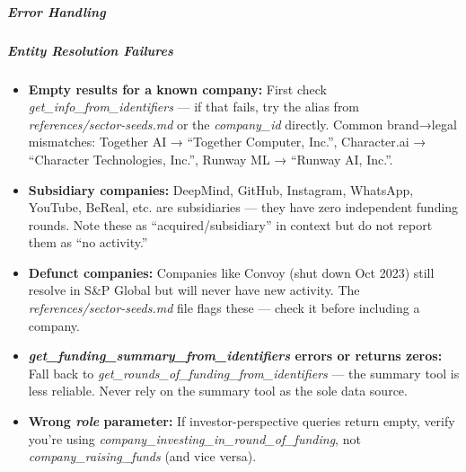 \documentclass[11pt]{article}
\begin{document}
\subparagraph{Error Handling}\mbox{}\par

\subparagraph{Entity Resolution Failures}\mbox{}\par
\begin{itemize}[leftmargin=*,itemsep=2pt,topsep=2pt]
\item {} \textbf{Empty results for a known company:} First check \emph{get\_\allowbreak{}info\_\allowbreak{}from\_\allowbreak{}identifiers} — if that fails, try the alias from \emph{references/sector-seeds.md} or the \emph{company\_\allowbreak{}id} directly. Common brand→legal mismatches: Together AI → ``Together Computer, Inc.'', Character.ai → ``Character Technologies, Inc.'', Runway ML → ``Runway AI, Inc.''.
\item {} \textbf{Subsidiary companies:} DeepMind, GitHub, Instagram, WhatsApp, YouTube, BeReal, etc. are subsidiaries — they have zero independent funding rounds. Note these as ``acquired/subsidiary'' in context but do not report them as ``no activity.''
\item {} \textbf{Defunct companies:} Companies like Convoy (shut down Oct 2023) still resolve in S\&P Global but will never have new activity. The \emph{references/sector-seeds.md} file flags these — check it before including a company.
\item {} \textbf{\emph{get\_\allowbreak{}funding\_\allowbreak{}summary\_\allowbreak{}from\_\allowbreak{}identifiers} errors or returns zeros:} Fall back to \emph{get\_\allowbreak{}rounds\_\allowbreak{}of\_\allowbreak{}funding\_\allowbreak{}from\_\allowbreak{}identifiers} — the summary tool is less reliable. Never rely on the summary tool as the sole data source.
\item {} \textbf{Wrong \emph{role} parameter:} If investor-perspective queries return empty, verify you're using \emph{company\_\allowbreak{}investing\_\allowbreak{}in\_\allowbreak{}round\_\allowbreak{}of\_\allowbreak{}funding}, not \emph{company\_\allowbreak{}raising\_\allowbreak{}funds} (and vice versa).
\end{itemize}
\end{document}
